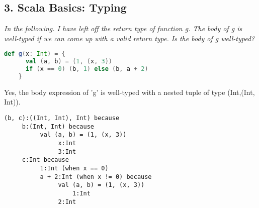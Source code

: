 \message{ !name(lab1-writeup.tex)}\documentclass[a4paper, 10pt]{article}
\begin{document}
  \subsection*{3. Scala Basics: Typing}
  \textit{In the following. I have left off the return type of function g. The body of g is well-typed if we can come up with a valid return type. Is the body of g well-typed?}
  \begin{lstlisting}[language=Scala]
    def g(x: Int) = {
      val (a, b) = (1, (x, 3))
      if (x == 0) (b, 1) else (b, a + 2)
    }
  \end{lstlisting}

  \vspace{0.2in}
  Yes, the body expression of 'g' is well-typed with a nested tuple of type (Int,(Int, Int)).

\begin{verbatim}
(b, c):((Int, Int), Int) because
     b:(Int, Int) because
          val (a, b) = (1, (x, 3))
               x:Int
               3:Int
     c:Int because
          1:Int (when x == 0)
          a + 2:Int (when x != 0) because
               val (a, b) = (1, (x, 3))
                   1:Int
               2:Int
\end{verbatim}

  \vspace{0.2in}
\end{document}
